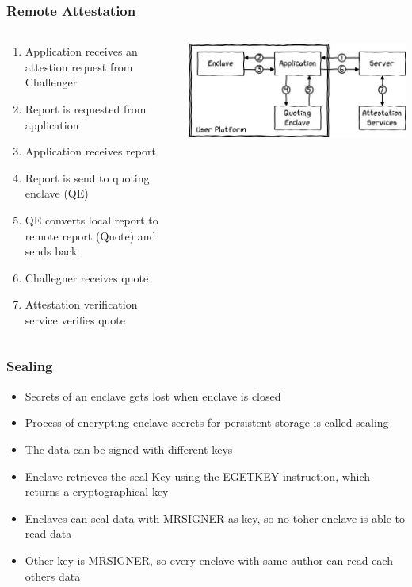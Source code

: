 \begin{frame}
    \frametitle{Remote Attestation}
    \begin{columns}
        \begin{column}{0.4\textwidth}
            \begin{enumerate}[<+->]
                \item Application receives an attestion request from Challenger
                \item Report is requested from application
                \item Application receives report
                \item Report is send to quoting enclave (QE)
                \item QE converts local report to remote report (Quote) and sends back
                \item Challegner receives quote
                \item Attestation verification service verifies quote
            \end{enumerate}
        \end{column}
        \begin{column}{0.6\textwidth}
            \includegraphics[scale=0.4]{Images/remote_attestation.png}
        \end{column}
    \end{columns}
\end{frame}

\begin{frame}
    \frametitle{Sealing}
    \begin{itemize}[<+->]
        \item Secrets of an enclave gets lost when enclave is closed
        \item Process of encrypting enclave secrets for persistent storage is called sealing
        \item The data can be signed with different keys
        \item Enclave retrieves the seal Key using the EGETKEY instruction, which returns a cryptographical key
        \item Enclaves can seal data with MRSIGNER as key, so no toher enclave is able to read data
        \item Other key is MRSIGNER, so every enclave with same author can read each others data
    \end{itemize}
\end{frame}